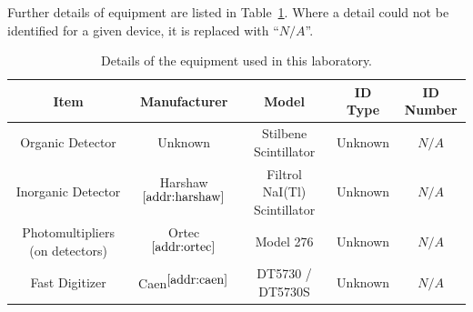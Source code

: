 \documentclass[12pt]{article}
\newcommand{\micCi}{$\mathrm{\mu Ci}$\xspace}
\begin{document}
\newcommand{\na}{$N/A$}
\newcommand{\sref}[1]{$^{\ref{#1}}$}
\FloatBarrier
Further details of equipment are listed in Table~\ref{tab:equip}.
Where a detail could not be identified for a given device, it is replaced with ``\na''.
\begin{table}[!h]
    \centering
    \small
    \caption{Details of the equipment used in this laboratory.}
    \label{tab:equip}
    \scriptsize
    \begin{tabular}{c|cccc}
        Item & Manufacturer & Model & ID Type & ID Number\\\hline
        Organic Detector & Unknown & Stilbene Scintillator & Unknown & \na \\
        Inorganic Detector & Harshaw\sref{addr:harshaw} & Filtrol NaI(Tl) Scintillator & Unknown & \na \\ 
        Photomultipliers (on detectors) & Ortec\sref{addr:ortec} & Model 276 & Unknown & \na \\
        Fast Digitizer & Caen\sref{addr:caen} & DT5730 / DT5730S & Unknown & \na \\

\end{tabular}
\end{table}
\end{document}
